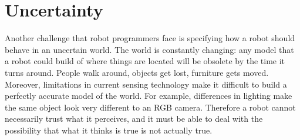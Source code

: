 \documentclass[10pt,twocolumn]{article}
\begin{document}
% 



\section{Uncertainty}


Another challenge that robot programmers face is specifying how a robot should behave in an uncertain world. The world is constantly changing: any model that a robot could build of where things are located will be obsolete by the time it turns around. People walk around, objects get lost, furniture gets moved. Moreover, limitations in current sensing technology make it difficult to build a perfectly accurate model of the world. For example, differences in lighting make the same object look very different to an RGB camera. Therefore a robot cannot necessarily trust what it perceives, and it must be able to deal with the possibility that what it thinks is true is not actually true.
\end{document}
